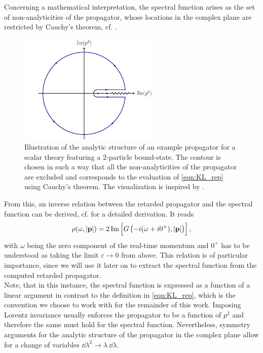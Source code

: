 Concerning a mathematical interpretation, the spectral function arises as the set of non-analyticities of the propagator, whose locations in the complex plane are restricted by Cauchy's theorem, cf. .\\
\begin{figure}[t]
	\centering
	\includegraphics[width=0.6\textwidth]{figs/tikz/contour}
	\caption[Illustration of the analytic structure of an example propagator for a scalar theory featuring a 2-particle bound-state.]{Illustration of the analytic structure of an example propagator for a scalar theory featuring a 2-particle bound-state. The contour is chosen in such a way that all the non-analyticities of the propagator are excluded and corresponds to the evaluation of \eqref{eqn:KL_rep} using Cauchy's theorem. The visualization is inspired by \cite{JiaPennington2017}.} 
	\label{fig:cauchy}
\end{figure}\noindent
From this, an inverse relation between the retarded propagator and the spectral function can be derived, cf.  for a detailed derivation. It reads
\begin{equation}
	\rho(\omega, \abs{\mathbf{p}}) = 2 \operatorname{Im}\left[G\left(-i(\omega + i0^+), \abs{\mathbf{p}}\right)\right], \label{eqn:specfunc_relation}
\end{equation}
with $\omega$ being the zero component of the real-time momentum and $0^+$ has to be understood as taking the limit $\varepsilon\rightarrow 0$ from above. This relation is of particular importance, since we will use it later on to extract the spectral function from the computed retarded propagator.\\
 Note, that in this instance, the spectral function is expressed as a function of a linear argument in contrast to the definition in \eqref{eqn:KL_rep}, which is the convention we choose to work with for the remainder of this work. Imposing Lorentz invariance usually enforces the propagator to be a function of $p^2$ and therefore the same must hold for the spectral function. Nevertheless, symmetry arguments for the analytic structure of the propagator in the complex plane allow for a change of variables $\dd\lambda^2 \rightarrow \lambda\ \dd\lambda$.\\
